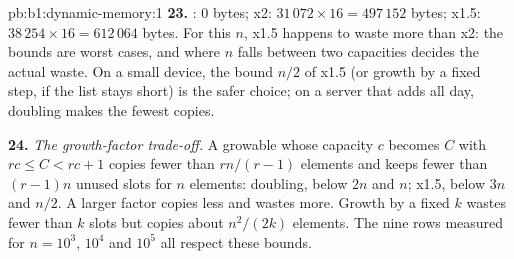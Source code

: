 \begin{solution}{pb:b1:dynamic-memory:1}
\textbf{23.} : 0 bytes; x2: $31\,072 \times 16 = 497\,152$ bytes; x1.5: $38\,254 \times 16 = 612\,064$ bytes.
For this $n$, x1.5 happens to waste more than x2: the bounds are worst cases, and where $n$ falls between two capacities
decides the actual waste. On a small device, the bound $n/2$ of x1.5 (or growth by a fixed step, if the list stays
short) is the safer choice; on a server that adds all day, doubling makes the fewest copies.

\textbf{24.} \emph{The growth-factor trade-off.} A growable  whose capacity $c$ becomes $C$ with
$rc \leq C < rc + 1$ copies fewer than $rn/(r-1)$ elements and keeps fewer than $(r-1)n$ unused slots for $n$ elements:
doubling, below $2n$ and $n$; x1.5, below $3n$ and $n/2$. A larger factor copies less and wastes more. Growth by a
fixed $k$ wastes fewer than $k$ slots but copies about $n^2/(2k)$ elements. The nine rows measured for $n = 10^3$,
$10^4$ and $10^5$ all respect these bounds.
\end{solution}
